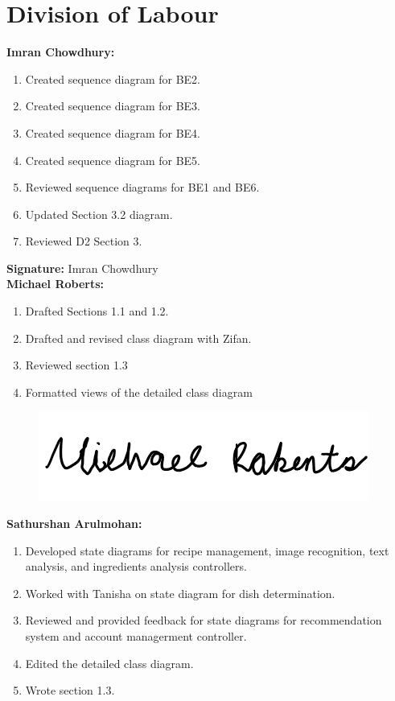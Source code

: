 \documentclass[]{article}
\begin{document}

\appendix
\section{Division of Labour}
\label{sec:division_of_labour}
\textbf{Imran Chowdhury:}
\begin{enumerate}
	\item Created sequence diagram for BE2.
	\item Created sequence diagram for BE3.
	\item Created sequence diagram for BE4.
	\item Created sequence diagram for BE5.
	\item Reviewed sequence diagrams for BE1 and BE6.
	\item Updated Section 3.2 diagram.
	\item Reviewed D2 Section 3.
\end{enumerate}

\textbf{Signature:} Imran Chowdhury \\

\textbf{Michael Roberts:}
\begin{enumerate}
	\item Drafted Sections 1.1 and 1.2.
	\item Drafted and revised class diagram with Zifan.
	\item Reviewed section 1.3
	\item Formatted views of the detailed class diagram
\end{enumerate}

\begin{figure}[H]
 	\centering
    \includegraphics[width=\textwidth]{image/A_Michael_Roberts_Signature.png}
\end{figure}

\textbf{Sathurshan Arulmohan:}
\begin{enumerate}
	\item Developed state diagrams for recipe management, image recognition, text analysis, and ingredients analysis controllers.
	\item Worked with Tanisha on state diagram for dish determination.
	\item Reviewed and provided feedback for state diagrams for recommendation system and account managerment controller.
	\item Edited the detailed class diagram.
	\item Wrote section 1.3.
\end{enumerate}
\end{document}
